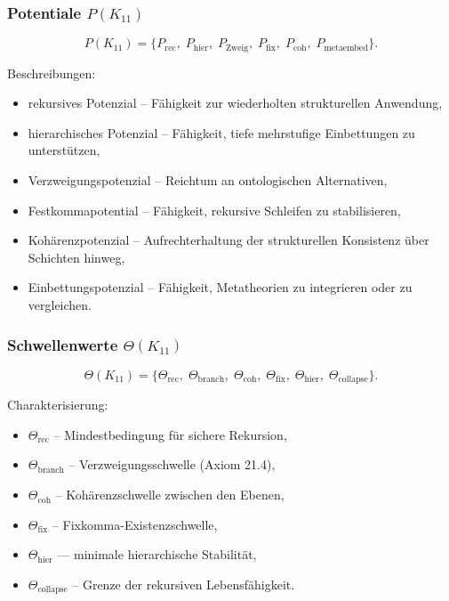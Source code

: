 \subsubsection{Potentiale $P(K_{11})$}

\[
P(K_{11})=
\{
P_{\mathrm{rec}},\;
P_{\mathrm{hier}},\;
P_{\mathrm{Zweig}},\;
P_{\mathrm{fix}},\;
P_{\mathrm{coh}},\;
P_{\mathrm{metaembed}}
\}.
\]

Beschreibungen:
\begin{itemize}
    \item rekursives Potenzial – Fähigkeit zur wiederholten strukturellen Anwendung,
    \item hierarchisches Potenzial – Fähigkeit, tiefe mehrstufige Einbettungen zu unterstützen,
    \item Verzweigungspotenzial – Reichtum an ontologischen Alternativen,
    \item Festkommapotential – Fähigkeit, rekursive Schleifen zu stabilisieren,
    \item Kohärenzpotenzial – Aufrechterhaltung der strukturellen Konsistenz über Schichten hinweg,
    \item Einbettungspotenzial – Fähigkeit, Metatheorien zu integrieren oder zu vergleichen.
\end{itemize}

\subsubsection{Schwellenwerte $\Theta(K_{11})$}

\[
\Theta(K_{11})=
\{
\Theta_{\mathrm{rec}},\;
\Theta_{\mathrm{branch}},\;
\Theta_{\mathrm{coh}},\;
\Theta_{\mathrm{fix}},\;
\Theta_{\mathrm{hier}},\;
\Theta_{\mathrm{collapse}}
\}.
\]

Charakterisierung:
\begin{itemize}
    \item $\Theta_{\mathrm{rec}}$ – Mindestbedingung für sichere Rekursion,
    \item $\Theta_{\mathrm{branch}}$ – Verzweigungsschwelle (Axiom 21.4),
    \item $\Theta_{\mathrm{coh}}$ – Kohärenzschwelle zwischen den Ebenen,
    \item $\Theta_{\mathrm{fix}}$ – Fixkomma-Existenzschwelle,
    \item $\Theta_{\mathrm{hier}}$ — minimale hierarchische Stabilität,
    \item $\Theta_{\mathrm{collapse}}$ – Grenze der rekursiven Lebensfähigkeit.
\end{itemize}


